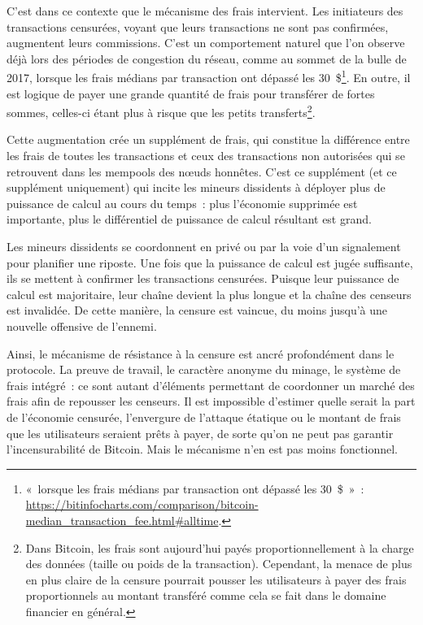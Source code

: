 C'est dans ce contexte que le mécanisme des frais intervient. Les initiateurs des transactions censurées, voyant que leurs transactions ne sont pas confirmées, augmentent leurs commissions. C'est un comportement naturel que l'on observe déjà lors des périodes de congestion du réseau, comme au sommet de la bulle de 2017, lorsque les frais médians par transaction ont dépassé les 30~\$\footnote{«~lorsque les frais médians par transaction ont dépassé les 30~\$~»~: \url{https://bitinfocharts.com/comparison/bitcoin-median_transaction_fee.html\#alltime}.}. En outre, il est logique de payer une grande quantité de frais pour transférer de fortes sommes, celles-ci étant plus à risque que les petits transferts\footnote{Dans Bitcoin, les frais sont aujourd'hui payés proportionnellement à la charge des données (taille ou poids de la transaction). Cependant, la menace de plus en plus claire de la censure pourrait pousser les utilisateurs à payer des frais proportionnels au montant transféré comme cela se fait dans le domaine financier en général.}.

Cette augmentation crée un supplément de frais, qui constitue la différence entre les frais de toutes les transactions et ceux des transactions non autorisées qui se retrouvent dans les mempools des nœuds honnêtes. C'est ce supplément (et ce supplément uniquement) qui incite les mineurs dissidents à déployer plus de puissance de calcul au cours du temps~: plus l'économie supprimée est importante, plus le différentiel de puissance de calcul résultant est grand.

Les mineurs dissidents se coordonnent en privé ou par la voie d'un signalement pour planifier une riposte. Une fois que la puissance de calcul est jugée suffisante, ils se mettent à confirmer les transactions censurées. Puisque leur puissance de calcul est majoritaire, leur chaîne devient la plus longue et la chaîne des censeurs est invalidée. De cette manière, la censure est vaincue, du moins jusqu'à une nouvelle offensive de l'ennemi.

Ainsi, le mécanisme de résistance à la censure est ancré profondément dans le protocole. La preuve de travail, le caractère anonyme du minage, le système de frais intégré~: ce sont autant d'éléments permettant de coordonner un marché des frais afin de repousser les censeurs. Il est impossible d'estimer quelle serait la part de l'économie censurée, l'envergure de l'attaque étatique ou le montant de frais que les utilisateurs seraient prêts à payer, de sorte qu'on ne peut pas garantir l'incensurabilité de Bitcoin. Mais le mécanisme n'en est pas moins fonctionnel.

